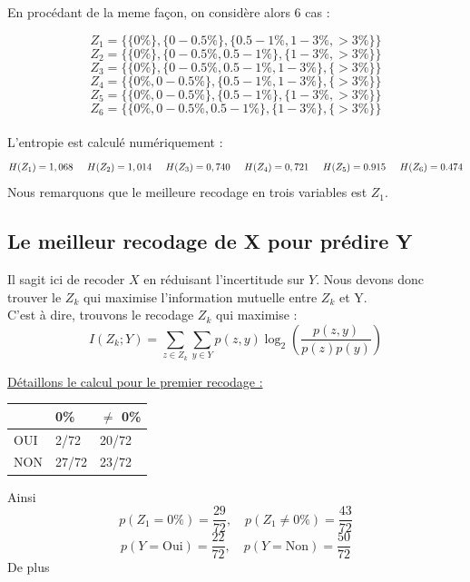 \documentclass{article}
\begin{document}
En procédant de la meme façon, on considère alors 6 cas :

\[
Z_1 =\{ \{0 \% \} , \{0 - 0.5 \%\} ,\{0.5-1 \% ,1-3 \% ,>3 \% \} \}  
\]
\[
  Z_2 =\{ \{0 \% \} , \{0 - 0.5\%, 0.5-1 \% \} ,\{1-3 \% ,>3 \% \} \}
\]
\[
  Z_3 =\{ \{0 \% \} , \{0 - 0.5\%, 0.5-1 \% ,1-3 \%  \} ,\{>3 \% \} \}
\]
\[
  Z_4 =\{ \{0 \%, 0 - 0.5\%\} , \{ 0.5-1 \% ,1-3 \%  \} ,\{>3 \% \} \}
\]
\[
  Z_5 =\{ \{0 \%, 0 - 0.5\%\} , \{ 0.5-1 \% \} ,\{1-3 \% , >3 \% \} \}
\]
\[
  Z_6 =\{ \{0 \%, 0 - 0.5\%,  0.5-1 \% \} , \{1-3 \%  \} ,\{>3 \% \} \}
\]
\\
L'entropie est calculé numériquement :
\[
H(Z_1) = 1,068 \hspace{0.5cm} H(Z_2) = 1,014 \hspace{0.5cm} H(Z_3) = 0,740 \hspace{0.5cm} H(Z_4) = 0,721 \hspace{0,5cm} H(Z_5) = 0.915 \hspace{0,5 cm} H(Z_6) = 0.474
\]
Nous remarquons que le meilleure recodage en trois variables est $Z_1$.

\subsection{Le meilleur recodage de X pour prédire Y }

Il sagit ici de recoder $X$ en réduisant l'incertitude sur $Y$.
Nous devons donc trouver le $Z_k$ qui maximise l'information mutuelle entre $Z_k$ et Y.
\\
C'est à dire, trouvons le recodage $Z_k$ qui maximise :
\begin{equation}
  I(Z_k; Y) = \sum_{z\in Z_k} \sum_{y \in Y} p(z, y) \log_2 \left( \frac{p(z, y)}{p(z)p(y)} \right)
  \label{eq:infomutu}
\end{equation}

\underline{Détaillons le calcul pour le premier recodage :}

\begin{table}[H]
  \centering
  \begin{tabular}{|l|l|l|}
  \hline
      & 0\%   & $\neq$ 0\% \\ \hline
  OUI & 2/72  & 20/72 \\ \hline
  NON & 27/72 & 23/72 \\ \hline
  \end{tabular}
  \end{table}
Ainsi
\[
p(Z_1 = 0\%) = \frac{29}{72}, \quad p(Z_1 \neq 0\%) = \frac{43}{72}
\]
\[
p(Y = \text{Oui}) = \frac{22}{72}, \quad p(Y = \text{Non}) = \frac{50}{72}
\]
De plus
\end{document}
